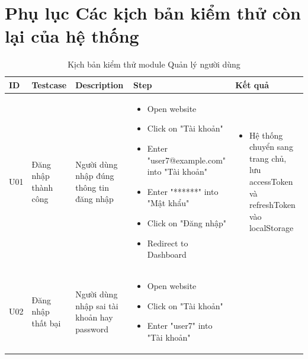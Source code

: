 \section{Phụ lục Các kịch bản kiểm thử còn lại của hệ thống}
\begin{longtable}{
    |>{\raggedright\arraybackslash}p{}
    |>{\raggedright\arraybackslash}p{}
    |>{\raggedright\arraybackslash}p{}
    |>{\raggedright\arraybackslash}p{}
    |>{\raggedright\arraybackslash}p{}|
}
    \caption{Kịch bản kiểm thử module Quản lý người dùng} \\
    \hline
    \textbf{ID} & \textbf{Testcase} & \textbf{Description} & \textbf{Step} & \textbf{Kết quả} \\
    \hline
    \vspace{0.1pt} U01 & \vspace{0.1pt} Đăng nhập thành công & \vspace{0.1pt} Người dùng nhập đúng thông tin đăng nhập & 
    \begin{itemize}[leftmargin=*,topsep=0pt,itemsep=0pt,label=--]
        \item Open website
        \item Click on "Tài khoản"
        \item Enter "user7@example.com" into "Tài khoản"
        \item Enter "******" into "Mật khẩu"
        \item Click on "Đăng nhập"
        \item Redirect to Dashboard
    \end{itemize} &
    \begin{itemize}[leftmargin=*,topsep=0pt,itemsep=0pt,label=--]
        \item Hệ thống chuyển sang trang chủ, lưu accessToken và refreshToken vào localStorage
    \end{itemize} \\
    \hline    
    \vspace{0.1pt} U02 & \vspace{0.1pt} Đăng nhập thất bại & \vspace{0.1pt} Người dùng nhập sai tài khoản hay password & 
    \begin{itemize}[leftmargin=*,topsep=0pt,itemsep=0pt,label=--]
        \item Open website
        \item Click on "Tài khoản"
        \item Enter "user7" into "Tài khoản"

\end{itemize}
\end{longtable}
